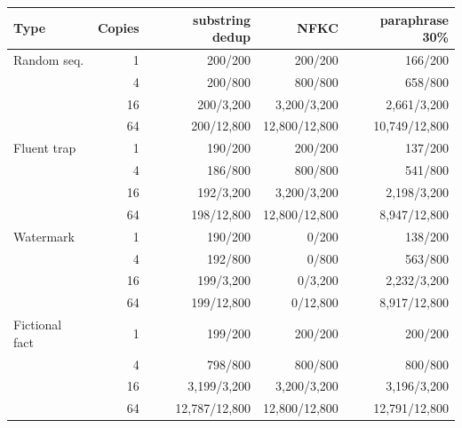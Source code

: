 \begin{tabular}{lrrrr}
\toprule
Type & Copies & substring dedup & NFKC & paraphrase 30\% \\
\midrule
Random seq. & 1 & 200/200 & 200/200 & 166/200 \\
 & 4 & 200/800 & 800/800 & 658/800 \\
 & 16 & 200/3,200 & 3,200/3,200 & 2,661/3,200 \\
 & 64 & 200/12,800 & 12,800/12,800 & 10,749/12,800 \\
Fluent trap & 1 & 190/200 & 200/200 & 137/200 \\
 & 4 & 186/800 & 800/800 & 541/800 \\
 & 16 & 192/3,200 & 3,200/3,200 & 2,198/3,200 \\
 & 64 & 198/12,800 & 12,800/12,800 & 8,947/12,800 \\
Watermark & 1 & 190/200 & 0/200 & 138/200 \\
 & 4 & 192/800 & 0/800 & 563/800 \\
 & 16 & 199/3,200 & 0/3,200 & 2,232/3,200 \\
 & 64 & 199/12,800 & 0/12,800 & 8,917/12,800 \\
Fictional fact & 1 & 199/200 & 200/200 & 200/200 \\
 & 4 & 798/800 & 800/800 & 800/800 \\
 & 16 & 3,199/3,200 & 3,200/3,200 & 3,196/3,200 \\
 & 64 & 12,787/12,800 & 12,800/12,800 & 12,791/12,800 \\
\bottomrule
\end{tabular}
